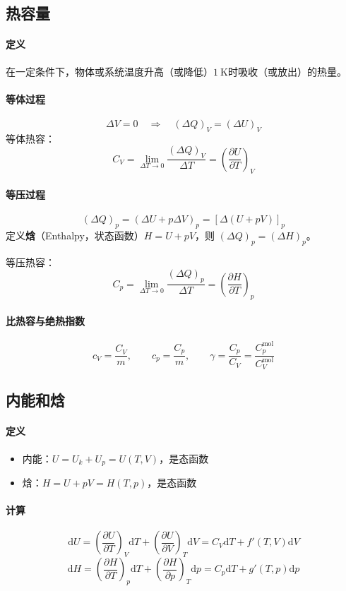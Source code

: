 \documentclass[UTF8]{ctexart}
\begin{document}
\subsection{热容量}

\paragraph{定义}
在一定条件下，物体或系统温度升高（或降低）$1\ \mathrm{K}$时吸收（或放出）的热量。

\paragraph{等体过程}
\[
\Delta V=0\quad\Longrightarrow\quad (\Delta Q)_V=(\Delta U)_V
\]
等体热容：
\[
\boxed{C_V=\lim_{\Delta T\to 0}\frac{(\Delta Q)_V}{\Delta T}
=\left(\frac{\partial U}{\partial T}\right)_V}
\]

\paragraph{等压过程}
\[
(\Delta Q)_p=(\Delta U+p\Delta V)_p=[\Delta(U+pV)]_p
\]
定义\textbf{焓}（Enthalpy，状态函数）$H=U+pV$，则 $(\Delta Q)_p=(\Delta H)_p$。

等压热容：
\[
\boxed{C_p=\lim_{\Delta T\to 0}\frac{(\Delta Q)_p}{\Delta T}
=\left(\frac{\partial H}{\partial T}\right)_p}
\]

\paragraph{比热容与绝热指数}
\[
c_V=\frac{C_V}{m},\qquad c_p=\frac{C_p}{m},\qquad
\boxed{\gamma=\frac{C_p}{C_V}=\frac{C_p^{\mathrm{mol}}}{C_V^{\mathrm{mol}}}}
\]

\subsection{内能和焓}

\paragraph{定义}
\begin{itemize}[leftmargin=2em]
  \item 内能：$U=U_k+U_p=U(T,V)$，是态函数
  \item 焓：$H=U+pV=H(T,p)$，是态函数
\end{itemize}

\paragraph{计算}
\[
\mathrm{d}U=\left(\frac{\partial U}{\partial T}\right)_V\mathrm{d}T
+\left(\frac{\partial U}{\partial V}\right)_T\mathrm{d}V
=C_V\mathrm{d}T+f'(T,V)\mathrm{d}V
\]
\[
\mathrm{d}H=\left(\frac{\partial H}{\partial T}\right)_p\mathrm{d}T
+\left(\frac{\partial H}{\partial p}\right)_T\mathrm{d}p
=C_p\mathrm{d}T+g'(T,p)\mathrm{d}p
\]
\end{document}
